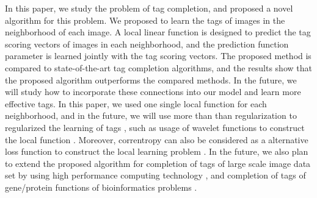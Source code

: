 \documentclass[runningheads,a4paper]{llncs}
\begin{document}
In this paper, we study the problem of tag completion, and proposed a novel algorithm for this problem. We proposed to learn the tags of images in the neighborhood of each image. A local linear function is designed to predict the tag scoring vectors of images in each neighborhood, and the prediction function parameter is learned jointly with the tag scoring vectors. The proposed method is compared to state-of-the-art tag completion algorithms, and the results show that the proposed algorithm outperforms the compared methods. In the future, we will study how to incorporate these connections into our model and learn more effective tags. In this paper, we used one single local function for each neighborhood, and in the future, we will use more than than regularization to regularized the learning of tags \cite{wang2012multiplegraph,wang2013multiple}, such as usage of wavelet functions to construct the local function \cite{liu2012wavpeak}. Moreover, correntropy can also be considered as a alternative loss function to construct the local learning problem \cite{wang2013non,Xing2014483,Li2015850,Zhang2015120,wang2014effective}. In the future, we also plan to extend the proposed algorithm for completion of tags of large scale image data set by using high performance computing technology \cite{zhou2013exploring,wang2015towards,zhang2011gpapriori,zhang2013accelerating,zhang2011frequent,zhang2013fpga,gao2014sparse,zhang2014lucas,li2013zht,zhao2014fusionfs,li2013distributed,wang2013using,wang2014optimizing,wang2014next}, and completion of tags of gene/protein functions of bioinformatics problems \cite{hu2009improving,zhang2009bayesian,zhang2010bioinformatics,hu2009improving,wang2015multiple,wang2015supervised}.


%
%
\end{document}
